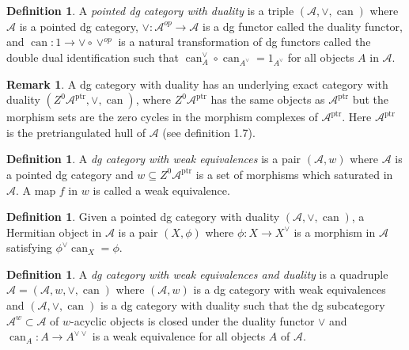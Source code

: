 \documentclass[edeposit,fullpage]{uiucthesis2009}
\newcommand{\mc}{\mathcal}
\newcommand{\ptr}{\mathrm{ptr}}
\DeclareMathOperator{\can}{can}
\theoremstyle{plain}
\numberwithin{lemma}{section}
\theoremstyle{definition}
\newtheorem{definition}[lemma]{Definition}
\newtheorem{remark}[lemma]{Remark}
\begin{document}
\begin{definition}
A \emph{pointed dg category with duality} is a triple $(\mc
A,\vee,\can)$ where $\mc A$ is a pointed dg category, $\vee : \mc
A^{op} \rightarrow \mc A$ is a dg functor called the duality functor,
and $\can : 1 \rightarrow \vee \circ \vee^{op}$ is a natural
transformation of dg functors called the double dual identification
such that $\can_A^\vee \circ \can_{A^\vee} = 1_{A^\vee}$ for all
objects $A$ in $\mc A$. 
\end{definition}

\begin{remark}
A dg category with duality has an underlying
exact category with duality $(Z^0\mc
A^{\ptr},\vee,\can)$, where $Z^0\mc A^{\ptr}$ has the same objects
as $\mc A^{\ptr}$ but the morphism sets are the zero cycles in the morphism
complexes of $\mc A^\ptr$. Here $\mc A^\ptr$ is the pretriangulated hull
of $\mc A$ (see \cite{Schder} definition 1.7).
\end{remark}

\begin{definition}
A \emph{dg category with weak equivalences} is a pair $(\mc A,w)$
where $\mc A$ is a pointed dg category and $w \subseteq Z^0 \mc
A^\ptr$ is a set of morphisms which saturated in $\mc A$. A map $f$ in
$w$ is called a weak equivalence.
\end{definition}

\begin{definition}
Given a pointed dg category with duality $(\mc A,\vee,\can)$, a
Hermitian object in $\mc A$ is a pair $(X,\phi)$ where $\phi : X
\rightarrow X^{\vee}$ is a morphism in $\mc A$ satisfying
$\phi^{\vee}\can_X = \phi$.
\end{definition}

\begin{definition}
A \emph{dg category with weak equivalences and duality} is a quadruple
$\mathscr A = (\mc A, w, \vee, \can)$ where $(\mc A,w)$ is a dg
category with weak equivalences and $(\mc A,\vee,\can)$ is a dg
category with duality such that the dg subcategory $\mc A^w \subset
\mc A$ of $w$-acyclic objects is closed under the duality functor
$\vee$ and $\can_A : A \rightarrow A^{\vee\vee}$ is a weak equivalence
for all objects $A$ of $\mc A$. 
\end{definition}
\end{document}
